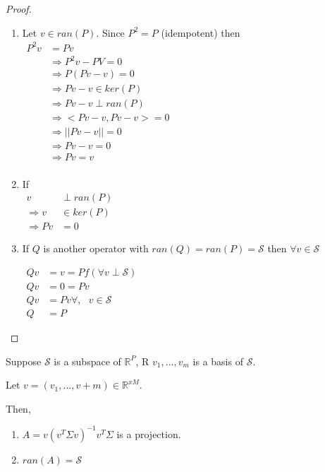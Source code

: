\documentclass[11pt,fleqn]{book} %
\begin{document}
\begin{proof}
	\begin{enumerate}
		\item Let $v \in ran(P)$. Since $P^2 = P$ (idempotent) then\\ 
			$\begin{aligned}
					P^2 v &= Pv\\
					&\Rightarrow P^2 v - PV = 0\\
					&\Rightarrow P(Pv-v) = 0 \\
					&\Rightarrow Pv - v \in ker(P)\\
					&\Rightarrow Pv - v \perp ran(P)\\
					&\Rightarrow <Pv - v, Pv - v> = 0\\
					&\Rightarrow ||Pv - v || = 0\\
					&\Rightarrow Pv - v = 0\\
					&\Rightarrow Pv = v\\	
			\end{aligned}$
	\item If\\ 
		$\begin{aligned}
				v &\perp ran(P)\\
				\Rightarrow v &\in ker(P)\\
				\Rightarrow Pv &= 0
		\end{aligned}$

	\item If $Q$ is another operator with $ran(Q) = ran(P) = \mathscr{S}$ then $\forall v \in \mathscr{S}$

		$\begin{aligned}
			Qv &= v = Pf (\forall v \perp \mathscr{S})\\
			Qv &= 0 = Pv\\
			Qv &= Pv \forall,\text{ } v \in \mathscr{S}\\
			Q &= P
		\end{aligned}$
	
	\end{enumerate}
\end{proof}


\begin{theorem}
	Suppose $\mathscr{S}$ is a subspace of $\mathbb{R}^P$, R $v_1, \dots, v_m$ is a basis of $\mathscr{S}$. 

	Let $v = (v_1, \dots, v+m) \in \mathbb{R}^{xM}$. 

	Then, 

	\begin{enumerate}
		\item $A = v(v^T\Sigma v)^{-1}v^T \Sigma$ is a projection.
		\item $ran(A) = \mathscr{S}$ 
	\end{enumerate}
\end{theorem}
\end{document}
